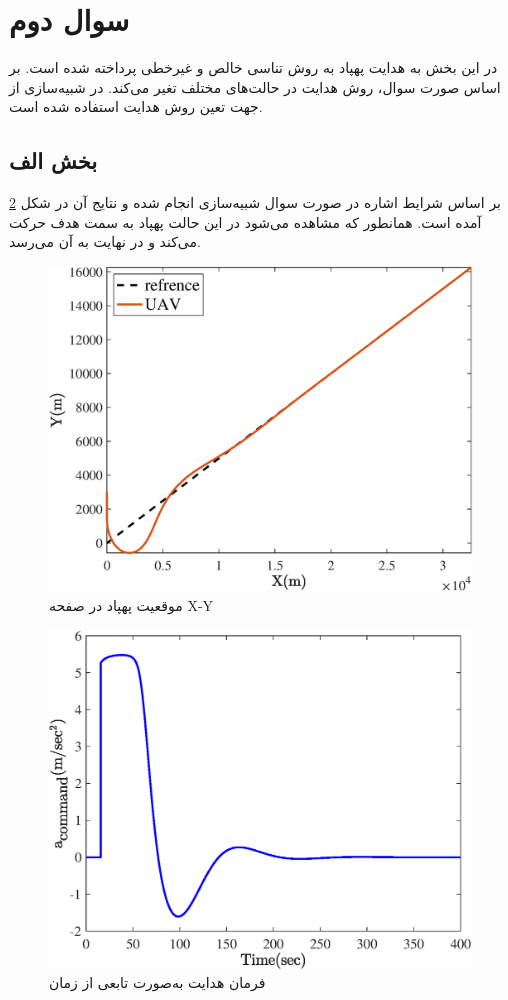 \section{سوال دوم}
در این بخش به هدایت  پهپاد به روش تناسی خالص و غیرخطی پرداخته شده است. بر اساس صورت سوال، روش هدایت در حالت‌های مختلف تغیر می‌کند.
در شبیه‌سازی از 
جهت تعین روش هدایت استفاده شده است. 
\subsection{بخش الف}
بر اساس شرایط اشاره در صورت سوال شبیه‌سازی انجام شده و نتایج آن در شکل \ref{fig:q2_1} آمده است. همانطور که مشاهده می‌شود در این حالت پهپاد به سمت هدف حرکت می‌کند و در نهایت به آن می‌رسد.
\begin{figure}[H]
    \label{fig:q2_1}
	\centering
	\includegraphics[width=.75\linewidth]{../Figure/Q2/a/xy}
	\caption{موقعیت پهپاد در صفحه X-Y  }
\end{figure}

\begin{figure}[H]
    \label{fig:q2_1}
	\centering
	\includegraphics[width=.75\linewidth]{../Figure/Q2/a/acc}
	\caption{فرمان هدایت به‌صورت تابعی از زمان}
\end{figure}


